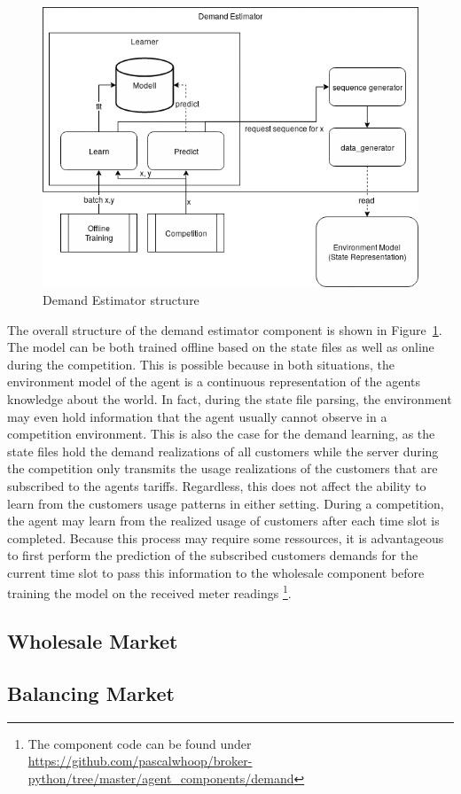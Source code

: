 \begin{figure}[h]
	\centering
	\includegraphics[width=0.8\linewidth]{img/UsageEstimator.png}
	\caption{Demand Estimator structure}
	\label{fig:DemandEstimator}
\end{figure}


The overall structure of the demand estimator component is shown in Figure~\ref{fig:DemandEstimator}. The model can be both trained offline based on the state files as well as online during the competition. This is possible because in both situations, the environment model of the agent is a continuous representation of the agents knowledge about the world. In fact, during the state file parsing, the environment may even hold information that the agent usually cannot observe in a competition environment. This is also the case for the demand learning, as the state files hold the demand realizations of all customers while the server during the competition only transmits the usage realizations of the customers that are subscribed to the agents tariffs. Regardless, this does not affect the ability to learn from the customers usage patterns in either setting. During a competition, the agent may learn from the realized usage of customers after each time slot is completed. Because this process may require some ressources, it is advantageous to first perform the prediction of the subscribed customers demands for the current time slot to pass this information to the wholesale component before training the model on the received meter readings
\footnote{The component code can be found under \url{https://github.com/pascalwhoop/broker-python/tree/master/agent_components/demand}}.


\subsection{Wholesale Market}
\subsection{Balancing Market}
